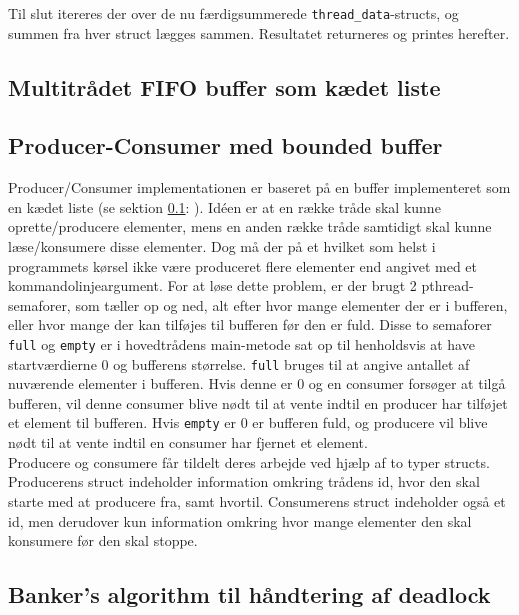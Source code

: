 Til slut itereres der over de nu færdigsummerede \texttt{thread_data}-structs, og summen fra hver struct lægges sammen. Resultatet returneres og printes herefter. \\ 

\subsection{Multitrådet FIFO buffer som kædet liste}
\label{list.c}

\subsection{Producer-Consumer med bounded buffer}
Producer/Consumer implementationen er baseret på en buffer implementeret som en kædet liste (se sektion \ref{list.c}: ). Idéen er at en række tråde skal kunne oprette/producere elementer, mens en anden række tråde samtidigt skal kunne læse/konsumere disse elementer. Dog må der på et hvilket som helst i programmets kørsel ikke være produceret flere elementer end angivet med et kommandolinjeargument. For at løse dette problem, er der brugt 2 pthread-semaforer, som tæller op og ned, alt efter hvor mange elementer der er i bufferen, eller hvor mange der kan tilføjes til bufferen før den er fuld. Disse to semaforer \texttt{full} og \texttt{empty} er i hovedtrådens main-metode sat op til henholdsvis at have startværdierne 0 og bufferens størrelse. \texttt{full} bruges til at angive antallet af nuværende elementer i bufferen. Hvis denne er 0 og en consumer forsøger at tilgå bufferen, vil denne consumer blive nødt til at vente indtil en producer har tilføjet et element til bufferen. Hvis \texttt{empty} er 0 er bufferen fuld, og producere vil blive nødt til at vente indtil en consumer har fjernet et element.\\

Producere og consumere får tildelt deres arbejde ved hjælp af to typer structs. Producerens struct indeholder information omkring trådens id, hvor den skal starte med at producere fra, samt hvortil. Consumerens struct indeholder også et id, men derudover kun information omkring hvor mange elementer den skal konsumere før den skal stoppe.

\subsection{Banker's algorithm til håndtering af deadlock}

